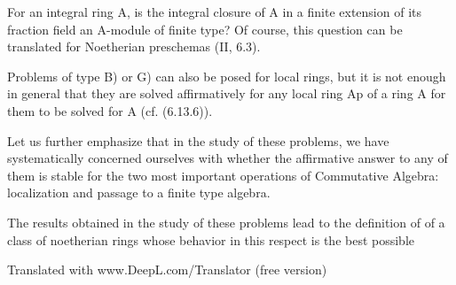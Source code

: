 For an integral ring A, is the integral closure of A in a finite extension of its fraction field an A-module of finite type? Of course, this question can be translated for Noetherian preschemas (II, 6.3).

Problems of type B) or G) can also be posed for local rings, but it is not enough in general that they are solved affirmatively for any local ring Ap of a ring A for them to be solved for A (cf. (6.13.6)).

Let us further emphasize that in the study of these problems, we have systematically concerned ourselves with whether the affirmative answer to any of them is stable for the two most important operations of Commutative Algebra: localization and passage to a finite type algebra.

The results obtained in the study of these problems lead to the definition of of a class of noetherian rings whose behavior in this respect is the best possible 

Translated with www.DeepL.com/Translator (free version)


